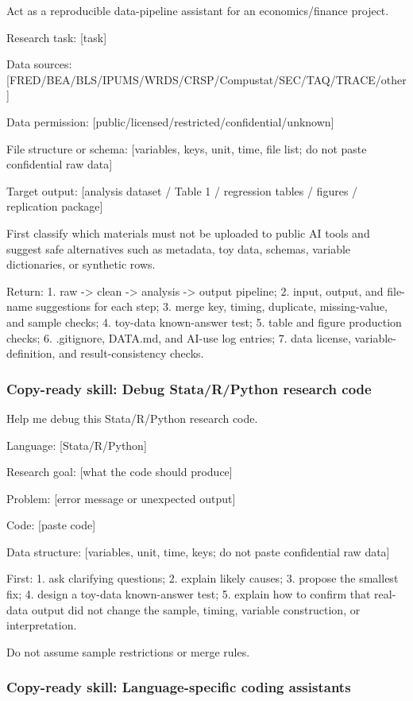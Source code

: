 \documentclass[11pt]{article}
\newcommand{\skill}[1]{\subsubsection*{Copy-ready skill: #1}}
\begin{document}
\begin{promptblock}
Act as a reproducible data-pipeline assistant for an economics/finance project.

Research task:
[task]

Data sources:
[FRED/BEA/BLS/IPUMS/WRDS/CRSP/Compustat/SEC/TAQ/TRACE/other]

Data permission:
[public/licensed/restricted/confidential/unknown]

File structure or schema:
[variables, keys, unit, time, file list; do not paste confidential raw data]

Target output:
[analysis dataset / Table 1 / regression tables / figures / replication package]

First classify which materials must not be uploaded to public AI tools and suggest
safe alternatives such as metadata, toy data, schemas, variable dictionaries, or
synthetic rows.

Return:
1. raw -> clean -> analysis -> output pipeline;
2. input, output, and file-name suggestions for each step;
3. merge key, timing, duplicate, missing-value, and sample checks;
4. toy-data known-answer test;
5. table and figure production checks;
6. .gitignore, DATA.md, and AI-use log entries;
7. data license, variable-definition, and result-consistency checks.
\end{promptblock}

\skill{Debug Stata/R/Python research code}

\begin{promptblock}
Help me debug this Stata/R/Python research code.

Language:
[Stata/R/Python]

Research goal:
[what the code should produce]

Problem:
[error message or unexpected output]

Code:
[paste code]

Data structure:
[variables, unit, time, keys; do not paste confidential raw data]

First:
1. ask clarifying questions;
2. explain likely causes;
3. propose the smallest fix;
4. design a toy-data known-answer test;
5. explain how to confirm that real-data output did not change the sample,
   timing, variable construction, or interpretation.

Do not assume sample restrictions or merge rules.
\end{promptblock}

\skill{Language-specific coding assistants}
\end{document}
